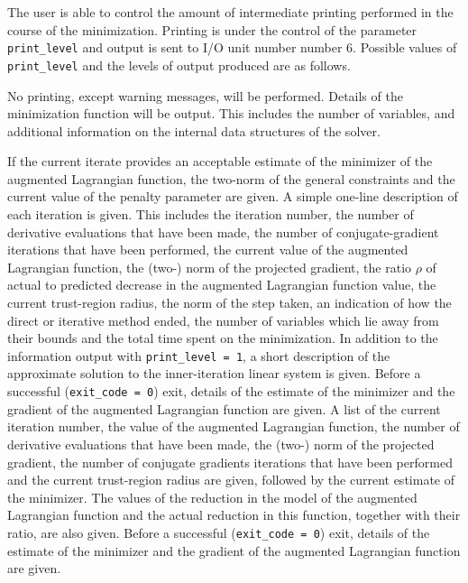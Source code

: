 \documentclass{galahad}
\begin{document}
The user is able to control the amount of intermediate printing
performed in the course of the minimization. Printing is under
the control of the parameter {\tt print\_level} and output is sent to
I/O unit number number 6. Possible values of {\tt print\_level} and the levels
of output produced are as follows.
\begin{description}
 No printing, except warning messages, will be
   performed.
 Details of the minimization function will be
   output. This includes the number of variables, and additional
   information on the internal data structures of the solver.

                 If the current iterate provides an acceptable
                 estimate of the minimizer of the augmented Lagrangian
                 function, the two-norm of the general constraints and
                 the current value of the penalty parameter are given.
 A simple one-line description of each iteration is
                 given. This includes the iteration number, the
                 number of derivative evaluations that have been
                 made, the number of conjugate-gradient iterations
                 that have been performed,
                 the current value of the augmented Lagrangian
                 function, the (two-) norm
                 of the projected gradient,
                 the ratio $\rho$ of actual to predicted decrease
                 in the augmented Lagrangian function value,
                 the current trust-region radius,
                 the norm of the step taken,
                 an indication of how the direct or iterative
                 method ended, the number of variables which lie
                 away from their bounds and the total time
                 spent on the minimization.
 In addition to the information output with
                 {\tt print\_level = 1},
                 a short description of the approximate solution
                 to the inner-iteration linear system is given.
                 Before a successful ({\tt exit\_code = 0}) exit, details of
                 the estimate of the minimizer and the
                 gradient of the augmented Lagrangian
                 function are given.
 A list of the current iteration number, the value
				 of the augmented Lagrangian function, the
                 number of derivative evaluations that have been
                 made, the (two-) norm
                 of the projected gradient,
                 the number of conjugate gradients
                 iterations that have been performed and the
                 current trust-region radius
                 are given, followed by the
                 current estimate of the minimizer.
                 The values of the reduction in the model of the
                 augmented Lagrangian function
                 and the actual reduction in this
                 function, together with their ratio, are also given.
                 Before a successful ({\tt exit\_code = 0}) exit, details of
                 the estimate of the minimizer and the
                 gradient of the augmented Lagrangian function are given.


\end{description}
\end{document}
